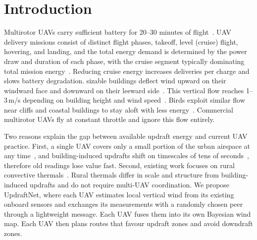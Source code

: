 \documentclass[conference]{IEEEtran}
\newcommand{\rd}[1]{#1}   %
\begin{document}
\section{Introduction}

Multirotor UAVs carry sufficient battery for 20--30 minutes
of flight~\cite{shakhatreh}. UAV delivery missions consist of distinct flight
phases, takeoff, level (cruise) flight, hovering, and landing,
and the total energy demand is determined by the power draw
and duration of each phase, with the cruise segment typically
dominating total mission energy~\cite{kirschstein}. Reducing cruise energy
increases deliveries per charge and slows battery degradation.
sizable buildings deflect wind upward on their windward face
and downward on their leeward side~\cite{holmes,asce}. This vertical
flow reaches 1--3\,m/s depending on building height and wind
speed~\cite{holmes,asce,kawamura}. Birds exploit similar flow near cliffs and
coastal buildings to stay aloft with less energy~\cite{pooley}. Commercial
multirotor UAVs fly at constant throttle and ignore this flow
entirely.

Two reasons explain the gap between available updraft
energy and current UAV practice. First, a single UAV covers
only a small portion of the urban airspace at any time~\cite{la},
and building-induced updrafts shift on timescales of tens of
seconds~\cite{tominaga}, therefore old readings lose value fast. Second,
existing work focuses on rural convective thermals~\cite{allen,reichmann}.
Rural thermals differ in scale and structure from building-induced
updrafts and do not require multi-UAV coordination.
We propose UpdraftNet, where each UAV estimates local
vertical wind from its existing onboard sensors and \rd{exchanges its measurements with a randomly chosen peer through a lightweight message}. \rd{Each UAV fuses them into its own Bayesian wind
map.} Each UAV then plans routes that favour updraft zones
and avoid downdraft zones.
\end{document}

